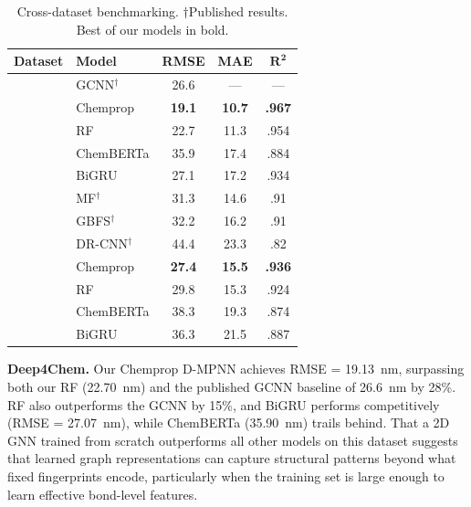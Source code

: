 \begin{table}[htbp]
\centering
\caption{Cross-dataset benchmarking. $\dagger$Published results. Best of our models in bold.}
\label{tab:cross_dataset}
\footnotesize
\setlength{\tabcolsep}{3pt}
\begin{tabular}{@{}llccc@{}}
\toprule
\textbf{Dataset} & \textbf{Model} & \textbf{RMSE} & \textbf{MAE} & $\boldsymbol{R^2}$ \\
\midrule
{}
  & GCNN$^\dagger$   & 26.6           & ---            & ---   \\
  & Chemprop         & \textbf{19.1}  & \textbf{10.7}  & \textbf{.967} \\
  & RF               & 22.7           & 11.3           & .954 \\
  & ChemBERTa        & 35.9           & 17.4           & .884 \\
  & BiGRU            & 27.1           & 17.2           & .934 \\
\midrule
{}
  & MF$^\dagger$     & 31.3           & 14.6           & .91  \\
  & GBFS$^\dagger$   & 32.2           & 16.2           & .91  \\
  & DR-CNN$^\dagger$ & 44.4           & 23.3           & .82  \\
  & Chemprop         & \textbf{27.4}  & \textbf{15.5}  & \textbf{.936} \\
  & RF               & 29.8           & 15.3           & .924 \\
  & ChemBERTa        & 38.3           & 19.3           & .874 \\
  & BiGRU            & 36.3           & 21.5           & .887 \\
\bottomrule
\end{tabular}
\end{table}

\textbf{Deep4Chem.}
Our Chemprop D-MPNN achieves RMSE = 19.13~nm, surpassing both our RF (22.70~nm) and the published GCNN baseline of 26.6~nm\cite{joung2021deep} by 28\%.
RF also outperforms the GCNN by 15\%, and BiGRU performs competitively (RMSE = 27.07~nm), while ChemBERTa (35.90~nm) trails behind.
That a 2D GNN trained from scratch outperforms all other models on this dataset suggests that learned graph representations can capture structural patterns beyond what fixed fingerprints encode, particularly when the training set is large enough to learn effective bond-level features.

